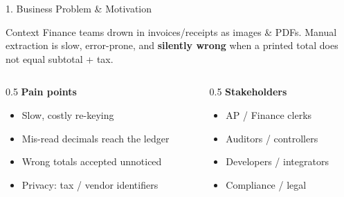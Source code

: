 \documentclass[10pt,aspectratio=169]{beamer}
\begin{document}
\begin{frame}{1. Business Problem \& Motivation}
\begin{block}{Context}
Finance teams drown in invoices/receipts as images \& PDFs. Manual extraction is slow, error-prone, and \textbf{silently wrong} when a printed total does not equal subtotal + tax.
\end{block}

\begin{columns}[T]
\begin{column}{0.5\textwidth}
\textbf{Pain points}
\begin{itemize}
  \item Slow, costly re-keying
  \item Mis-read decimals reach the ledger
  \item Wrong totals accepted unnoticed
  \item Privacy: tax / vendor identifiers
\end{itemize}
\end{column}
\begin{column}{0.5\textwidth}
\textbf{Stakeholders}
\begin{itemize}
  \item AP / Finance clerks
  \item Auditors / controllers
  \item Developers / integrators
  \item Compliance / legal
\end{itemize}
\end{column}
\end{columns}
\end{frame}
\end{document}
